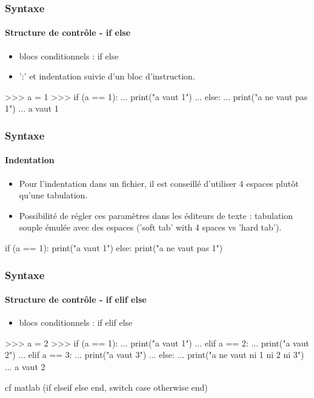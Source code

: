 \begin{frame}[fragile]
\frametitle{Syntaxe}
\framesubtitle{Structure de contrôle - if else}
\begin{itemize}
\item blocs conditionnels : if else
\item ':' et indentation suivie d'un bloc d'instruction.  
\end{itemize}
\begin{pythonConsole}
>>> a = 1
>>> if (a == 1): 
...     print("a vaut 1")
... else: 
...     print("a ne vaut pas 1")
...
a vaut 1
\end{pythonConsole}
\end{frame}
\begin{frame}[fragile]
\frametitle{Syntaxe}
\framesubtitle{Indentation}
\begin{itemize}
\item Pour l'indentation dans un fichier, il est conseillé d'utiliser 4 espaces plutôt qu'une tabulation. 
\item Possibilité de régler ces paramètres dans les éditeurs de texte : tabulation souple émulée avec des espaces ('soft tab' with 4 spaces vs 'hard tab'). 
\end{itemize}
\begin{python}
if (a == 1): 
    print("a vaut 1")
else: 
    print("a ne vaut pas 1")
\end{python}
\end{frame}
\begin{frame}[fragile]
\frametitle{Syntaxe}
\framesubtitle{Structure de contrôle - if elif else}
\begin{itemize}
\item blocs conditionnels : if elif else
\end{itemize}
\begin{pythonConsole}
>>> a = 2
>>> if (a == 1): 
...     print("a vaut 1")
... elif a == 2: 
...     print("a vaut 2")
... elif a == 3: 
...     print("a vaut 3")
... else: 
...     print("a ne vaut ni 1 ni 2 ni 3")
...
a vaut 2
\end{pythonConsole}
cf matlab (if elseif else end, switch case otherwise end) 
\end{frame}
